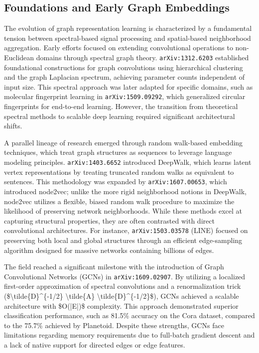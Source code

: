 \documentclass[11pt]{article}
\begin{document}
\subsection{Foundations and Early Graph Embeddings}

The evolution of graph representation learning is characterized by a fundamental tension between spectral-based signal processing and spatial-based neighborhood aggregation. Early efforts focused on extending convolutional operations to non-Euclidean domains through spectral graph theory. \texttt{arXiv:1312.6203} established foundational constructions for graph convolutions using hierarchical clustering and the graph Laplacian spectrum, achieving parameter counts independent of input size. This spectral approach was later adapted for specific domains, such as molecular fingerprint learning in \texttt{arXiv:1509.09292}, which generalized circular fingerprints for end-to-end learning. However, the transition from theoretical spectral methods to scalable deep learning required significant architectural shifts.

A parallel lineage of research emerged through random walk-based embedding techniques, which treat graph structures as sequences to leverage language modeling principles. \texttt{arXiv:1403.6652} introduced DeepWalk, which learns latent vertex representations by treating truncated random walks as equivalent to sentences. This methodology was expanded by \texttt{arXiv:1607.00653}, which introduced node2vec; unlike the more rigid neighborhood notions in DeepWalk, node2vec utilizes a flexible, biased random walk procedure to maximize the likelihood of preserving network neighborhoods. While these methods excel at capturing structural properties, they are often contrasted with direct convolutional architectures. For instance, \texttt{arXiv:1503.03578} (LINE) focused on preserving both local and global structures through an efficient edge-sampling algorithm designed for massive networks containing billions of edges.

The field reached a significant milestone with the introduction of Graph Convolutional Networks (GCNs) in \texttt{arXiv:1609.02907}. By utilizing a localized first-order approximation of spectral convolutions and a renormalization trick (\$\textbackslash{}tilde\{D\}\textasciicircum{}\{-1/2\} \textbackslash{}tilde\{A\} \textbackslash{}tilde\{D\}\textasciicircum{}\{-1/2\}\$), GCNs achieved a scalable architecture with \$O(|E|)\$ complexity. This approach demonstrated superior classification performance, such as 81.5\% accuracy on the Cora dataset, compared to the 75.7\% achieved by Planetoid. Despite these strengths, GCNs face limitations regarding memory requirements due to full-batch gradient descent and a lack of native support for directed edges or edge features.
\end{document}
